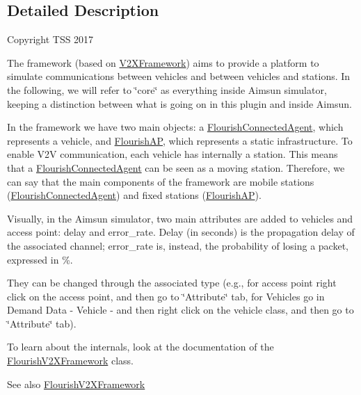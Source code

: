 \subsection{Detailed Description}
Copyright T\+SS 2017

The framework (based on \hyperlink{classV2XFramework}{V2\+X\+Framework}) aims to provide a platform to simulate communications between vehicles and between vehicles and stations. In the following, we will refer to \char`\"{}core\char`\"{} as everything inside Aimsun simulator, keeping a distinction between what is going on in this plugin and inside Aimsun.

In the framework we have two main objects\+: a \hyperlink{classFlourishConnectedAgent}{Flourish\+Connected\+Agent}, which represents a vehicle, and \hyperlink{classFlourishAP}{Flourish\+AP}, which represents a static infrastructure. To enable V2V communication, each vehicle has internally a station. This means that a \hyperlink{classFlourishConnectedAgent}{Flourish\+Connected\+Agent} can be seen as a moving station. Therefore, we can say that the main components of the framework are mobile stations (\hyperlink{classFlourishConnectedAgent}{Flourish\+Connected\+Agent}) and fixed stations (\hyperlink{classFlourishAP}{Flourish\+AP}).

Visually, in the Aimsun simulator, two main attributes are added to vehicles and access point\+: delay and error\+\_\+rate. Delay (in seconds) is the propagation delay of the associated channel; error\+\_\+rate is, instead, the probability of losing a packet, expressed in \%.

They can be changed through the associated type (e.\+g., for access point right click on the access point, and then go to \char`\"{}\+Attribute\char`\"{} tab, for Vehicles go in Demand Data -\/ Vehicle -\/ and then right click on the vehicle class, and then go to \char`\"{}\+Attribute\char`\"{} tab).

To learn about the internals, look at the documentation of the \hyperlink{classFlourishV2XFramework}{Flourish\+V2\+X\+Framework} class.

\begin{DoxySeeAlso}{See also}
\hyperlink{classFlourishV2XFramework}{Flourish\+V2\+X\+Framework} 
\end{DoxySeeAlso}
